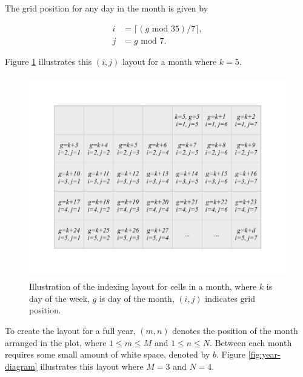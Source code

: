\documentclass[12pt]{article}
\begin{document}
The grid position for any day in the month is given by

\begin{equation}
  \begin{aligned}
  i &= \lceil (g \text{ mod } 35) / 7\rceil, \\
  j &= g \text{ mod } 7. \label{eq:grid}
  \end{aligned}
\end{equation}

Figure \ref{fig:month-diagram} illustrates this \((i,j)\) layout for a
month where \(k=5\).

\begin{figure}

{\centering \includegraphics[width=360pt,height=250pt]{img/month} 

}

\caption{Illustration of the indexing layout for cells in a month, where $k$ is day of the week, $g$ is day of the month, $(i, j)$ indicates grid position.}\label{fig:month-diagram}
\end{figure}

To create the layout for a full year, \((m, n)\) denotes the position of
the month arranged in the plot, where \(1 \le m \le M\) and
\(1 \le n \le N\). Between each month requires some small amount of
white space, denoted by \(b\). Figure \ref{fig:year-diagram} illustrates
this layout where \(M = 3\) and \(N = 4\).
\end{document}
